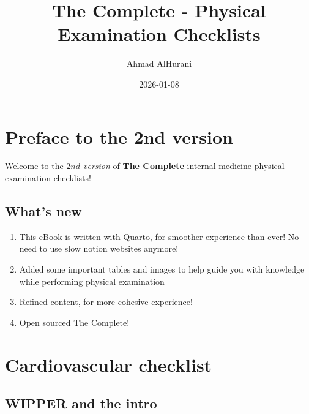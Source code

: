 \documentclass[
  13.5pt,
  a4paper,
  DIV=11,
  numbers=noendperiod]{scrreprt}
\title{The Complete - Physical Examination Checklists}
\author{Ahmad AlHurani}
\date{2026-01-08}
\renewcommand*\contentsname{Table of contents}
\newcommand\contentsname{Table of contents}
\begin{document}
\maketitle

\renewcommand*\contentsname{Table of contents}
{
\hypersetup{linkcolor=}
\setcounter{tocdepth}{2}
\tableofcontents
}


\chapter*{Preface to the 2nd version}\label{preface-to-the-2nd-version}


Welcome to the \emph{\(2nd\) version} of \textbf{The Complete} internal
medicine physical examination checklists!

\section*{What's new}\label{whats-new}


\begin{enumerate}
\def\labelenumi{\arabic{enumi}.}
\item
  This eBook is written with \href{https://quarto.org}{Quarto}, for
  smoother experience than ever! No need to use slow notion websites
  anymore!
\item
  Added some important tables and images to help guide you with
  knowledge while performing physical examination
\item
  Refined content, for more cohesive experience!
\item
  Open sourced The Complete!
\end{enumerate}


\chapter{Cardiovascular checklist}\label{cardiovascular-checklist}

\section{WIPPER and the intro}\label{wipper-and-the-intro}
\end{document}
